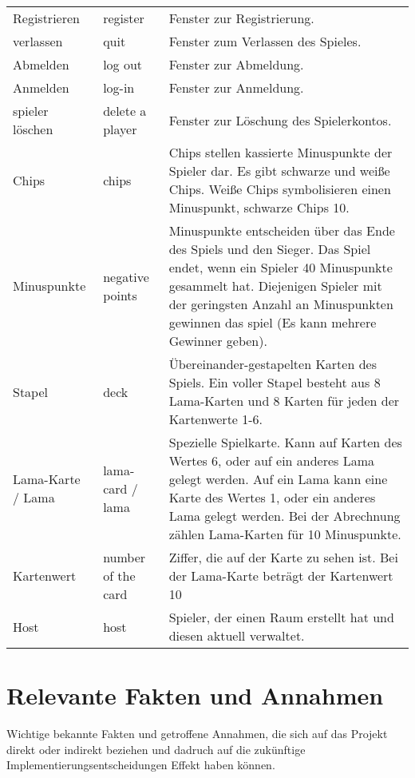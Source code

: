 \begin{center}
\begin{longtable}{p{} p{} p{}}
			Registrieren & register & Fenster zur Registrierung.\\
			verlassen & quit & Fenster zum Verlassen des Spieles.\\
			Abmelden & log out & Fenster zur Abmeldung.\\
			Anmelden & log-in & Fenster zur Anmeldung.\\
			spieler löschen & delete a player & Fenster zur Löschung des Spielerkontos.\\
			Chips & chips & Chips stellen kassierte Minuspunkte der Spieler dar. Es gibt schwarze und weiße Chips. Weiße Chips symbolisieren einen Minuspunkt, schwarze Chips 10. \\
			Minuspunkte & negative points & Minuspunkte entscheiden über das Ende des Spiels und den Sieger. Das Spiel endet, wenn ein Spieler 40 Minuspunkte gesammelt hat. Diejenigen Spieler mit der geringsten Anzahl an Minuspunkten gewinnen das spiel (Es kann mehrere Gewinner geben). \\
		    Stapel & deck & Übereinander-gestapelten Karten des Spiels. Ein voller Stapel besteht aus 8 Lama-Karten und 8 Karten für jeden der Kartenwerte 1-6. \\
		    Lama-Karte / Lama & lama-card / lama & Spezielle Spielkarte. Kann auf Karten des Wertes 6, oder auf ein anderes Lama gelegt werden. Auf ein Lama kann eine Karte des Wertes 1, oder ein anderes Lama gelegt werden. Bei der Abrechnung zählen Lama-Karten für 10 Minuspunkte. \\
		    Kartenwert & number of the card & Ziffer, die auf der Karte zu sehen ist. Bei der Lama-Karte beträgt der Kartenwert 10\\
		    Host & host & Spieler, der einen Raum erstellt hat und diesen aktuell verwaltet. \\
		\end{longtable}
\end{center}

\section{Relevante Fakten und Annahmen}

Wichtige bekannte Fakten und getroffene Annahmen, die sich auf das Projekt direkt oder indirekt beziehen und dadruch auf die zukünftige Implementierungsentscheidungen Effekt haben können.

\setcounter{fa}{10}

